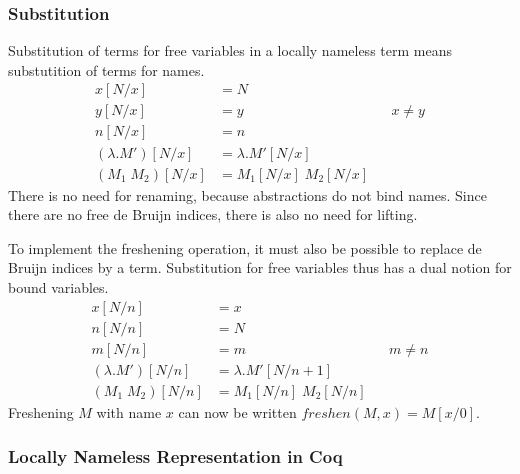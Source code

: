\documentclass[a4paper,11pt]{article}
\begin{document}
\subsubsection*{Substitution}

Substitution of terms for free variables in a locally nameless term
means substutition of terms for names.
\begin{align*}
  x[N/x]             &= N\\
  y[N/x]             &= y                 && \text{$x \neq y$} \\
  n[N/x]             &= n\\
  (\lambda .M')[N/x] &= \lambda .M'[N/x]\\
  (M_1 \; M_2)[N/x]  &= M_1[N/x] \; M_2[N/x]
\end{align*}
There is no need for renaming, because abstractions do not bind names.
Since there are no free de Bruijn indices, there is also no need
for lifting.

To implement the freshening operation, it must also be possible to
replace de Bruijn indices by a term.
Substitution for free variables thus has a dual notion for bound
variables.
\begin{align*}
  x[N/n]             &= x\\
  n[N/n]             &= N\\
  m[N/n]             &= m                    && \text{$m \neq n$} \\
  (\lambda .M')[N/n] &= \lambda .M'[N / n\!+\!1]\\
  (M_1 \; M_2)[N/n]  &= M_1[N/n] \; M_2[N/n]
\end{align*}
Freshening $M$ with name $x$ can now be written
$freshen(M, x) = M[x/0]$.

\subsubsection*{Locally Nameless Representation in Coq}
\end{document}
